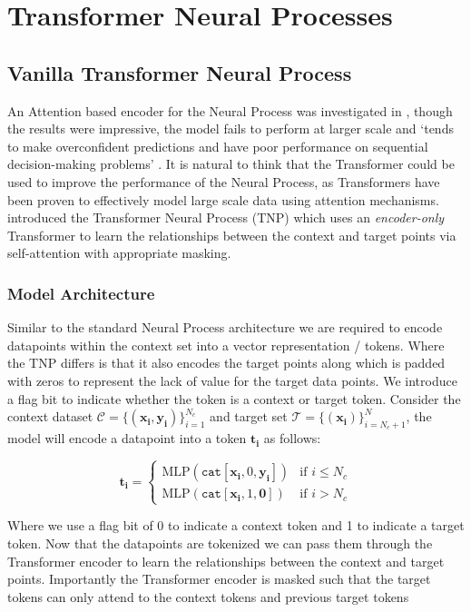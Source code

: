 \documentclass[../../main.tex]{subfiles}
\begin{document}
\section{Transformer Neural Processes}

\subsection{Vanilla Transformer Neural Process}

An Attention based encoder for the Neural Process was investigated in \cite{kim2019attentive}, though the results were impressive, the model fails to perform at larger scale and `tends to make overconfident predictions and have poor performance on sequential decision-making problems' \cite{nguyen2023transformer}. It is natural to think that the Transformer \cite{vaswani2017attention} could be used to improve the performance of the Neural Process, as Transformers have been proven to effectively model large scale data using attention mechanisms. \cite{nguyen2023transformer} introduced the Transformer Neural Process (TNP) which uses an \emph{encoder-only} Transformer to learn the relationships between the context and target points via self-attention with appropriate masking. 

\subsubsection{Model Architecture}

Similar to the standard Neural Process architecture we are required to encode datapoints within the context set into a vector representation / tokens. Where the TNP differs is that it also encodes the target points along which is padded with zeros to represent the lack of value for the target data points. We introduce a flag bit to indicate whether the token is a context or target token. Consider the context dataset $\mathcal{C} = \{(\bm{x_i}, \bm{y_i})\}_{i=1}^{N_c}$ and target set $\mathcal{T} = \{(\bm{x_i})\}_{i=N_c+1}^{N}$, the model will encode a datapoint into a token $\bm{t_i}$ as follows:

\[
	\bm{t_i} = \begin{cases}
		\text{MLP}(\texttt{cat}[\bm{x_i},  0, \bm{y_i}]) & \text{if } i \leq N_c \\
		\text{MLP}(\texttt{cat}[\bm{x_i},  1, \bm{ 0}]) & \text{if } i > N_c
	\end{cases}
\]

Where we use a flag bit of 0 to indicate a context token and 1 to indicate a target token. Now that the datapoints are tokenized we can pass them through the Transformer encoder to learn the relationships between the context and target points. Importantly the Transformer encoder is masked such that the target tokens can only attend to the context tokens and previous target tokens
\end{document}
